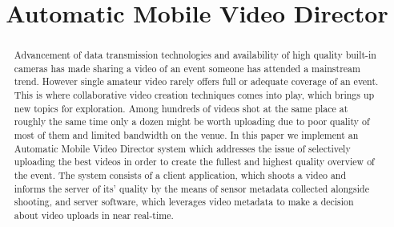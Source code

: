 \documentclass[conference]{IEEEtran}
\begin{document}
\title{Automatic Mobile Video Director}

\author{
\and
\and
\and
}


\maketitle

\begin{abstract}
Advancement of data transmission technologies and availability of high quality built-in cameras 
has made sharing a video of an event someone has attended a mainstream trend.
However single amateur video rarely offers full or adequate coverage of an event.
This is where collaborative video creation techniques comes into play, which brings up new topics for exploration.
Among hundreds of videos shot at the same place at roughly the same time only 
a dozen might be worth uploading due to poor quality of most of them and limited bandwidth on the venue.
In this paper we implement an Automatic Mobile Video Director system which addresses the issue of 
selectively uploading the best videos in order to create the fullest and highest quality overview of the event.
The system consists of a client application, which shoots a video and informs the server of its' quality 
by the means of sensor metadata collected alongside shooting,
and server software, which leverages video metadata to make a decision about video uploads in near real-time.

\end{abstract}
\end{document}
